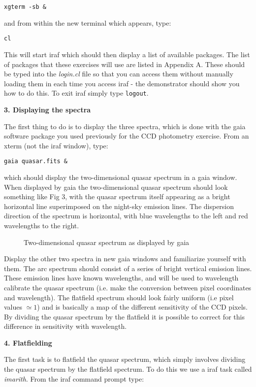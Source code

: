 {\tt \verb,xgterm -sb &,}

\noindent
and from within the new terminal which appears, type:

{\tt cl}

\noindent
This will start {\sc iraf} which should then display a list of available packages. The list of packages that these exercises will use are listed in Appendix A. These should be typed into the {\it login.cl} file so that you can access them without manually loading them in each time you access {\sc iraf} - the demonstrator should show you how to do this. To exit {\sc iraf} simply type {\tt logout}.

{\large {\bf 3. Displaying the spectra}}

The first thing to do is to display the three spectra, which is done with the {\sc gaia} software package you used previously for the CCD photometry exercise. From an xterm (not the {\sc iraf} window), type:

{\tt gaia quasar.fits \&}

which should display the two-dimensional quasar spectrum in a {\sc gaia} window. When displayed by {\sc gaia} the two-dimensional quasar spectrum should look something like Fig 3, with the quasar spectrum itself appearing as a bright horizontal line superimposed on the night-sky emission lines. The dispersion direction of the spectrum is horizontal, with blue wavelengths to the left and red wavelengths to the right.
\begin{figure}
\centerline{}
\caption{Two-dimensional quasar spectrum as displayed by {\sc gaia}}
\end{figure}

Display the other two spectra in new {\sc gaia} windows and familiarize yourself with them. The arc spectrum should consist of a series of bright vertical emission lines. These emission lines have known wavelengths, and will be used to wavelength calibrate the quasar spectrum (i.e. make the conversion between pixel coordinates and wavelength). The flatfield spectrum should look fairly uniform (i.e pixel values $\simeq1$) and is basically a map of the different sensitivity of the CCD pixels. By dividing the quasar spectrum by the flatfield it is possible to correct for this difference in sensitivity with wavelength.


{\large {\bf 4. Flatfielding}}

The first task is to flatfield the quasar spectrum, which simply involves dividing the quasar spectrum by the flatfield spectrum. To do this we use a {\sc iraf} task called {\it imarith}. From the {\sc iraf} command prompt type:

